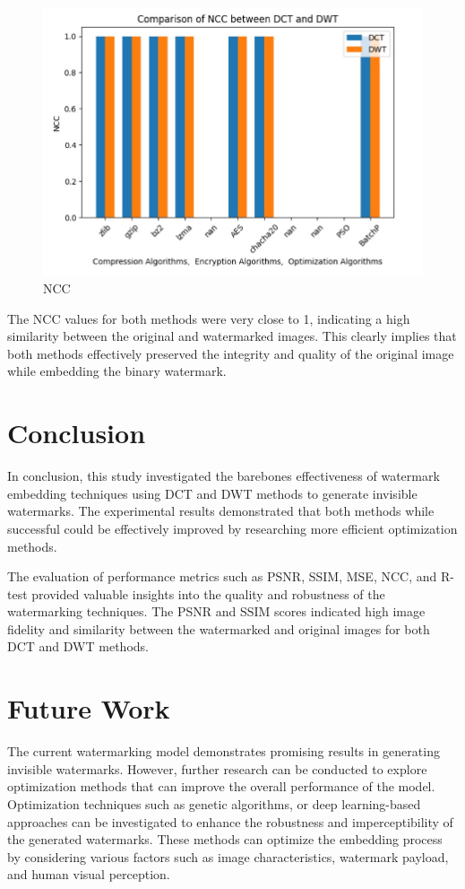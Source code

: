 \documentclass[conference]{IEEEtran}
\begin{document}
\begin{figure}[htbp]
\centering
\includegraphics[width=0.9\columnwidth]{ncc.jpg}
\caption{NCC}
\label{fig}
\end{figure}

The NCC values for both methods were very close to 1, indicating a high similarity between the original and watermarked images. This clearly implies that both methods effectively preserved the integrity and quality of the original image while embedding the binary watermark.

\vspace{10pt} %

\section{Conclusion}

In conclusion, this study investigated the barebones effectiveness of watermark embedding techniques using DCT and DWT methods to generate invisible watermarks. The experimental results demonstrated that both methods while successful could be effectively improved by researching more efficient optimization methods.

The evaluation of performance metrics such as PSNR, SSIM, MSE, NCC, and R-test provided valuable insights into the quality and robustness of the watermarking techniques. The PSNR and SSIM scores indicated high image fidelity and similarity between the watermarked and original images for both DCT and DWT methods.

\section{Future Work}
The current watermarking model demonstrates promising results in generating invisible watermarks. However, further research can be conducted to explore optimization methods that can improve the overall performance of the model. Optimization techniques such as genetic algorithms, or deep learning-based approaches can be investigated to enhance the robustness and imperceptibility of the generated watermarks. These methods can optimize the embedding process by considering various factors such as image characteristics, watermark payload, and human visual perception.
\end{document}
